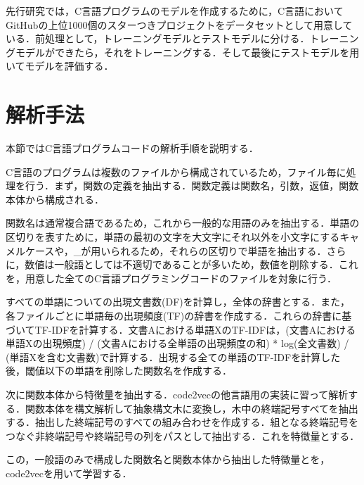 \documentclass[submit,techrep,noauthor]{ipsj}
\begin{document}
先行研究\cite{}では，C言語プログラムのモデルを作成するために，C言語においてGitHubの上位1000個のスターつきプロジェクトをデータセットとして用意している．前処理として，トレーニングモデルとテストモデルに分ける．トレーニングモデルができたら，それをトレーニングする．そして最後にテストモデルを用いてモデルを評価する．

\section{解析手法}

本節ではC言語プログラムコードの解析手順を説明する．

C言語のプログラムは複数のファイルから構成されているため，ファイル毎に処理を行う．まず，関数の定義を抽出する．関数定義は関数名，引数，返値，関数本体から構成される．

関数名は通常複合語であるため，これから一般的な用語のみを抽出する．単語の区切りを表すために，単語の最初の文字を大文字にそれ以外を小文字にするキャメルケースや，\_が用いられるため，それらの区切りで単語を抽出する．さらに，数値は一般語としては不適切であることが多いため，数値を削除する．これを，用意した全てのC言語プログラミングコードのファイルを対象に行う．

すべての単語についての出現文書数(DF)を計算し，全体の辞書とする．また，各ファイルごとに単語毎の出現頻度(TF)の辞書を作成する．これらの辞書に基づいてTF-IDFを計算する．文書Aにおける単語XのTF-IDFは，{(文書Aにおける単語Xの出現頻度) / (文書Aにおける全単語の出現頻度の和)} * log{(全文書数) / (単語Xを含む文書数)}で計算する．出現する全ての単語のTF-IDFを計算した後，閾値以下の単語を削除した関数名を作成する．

次に関数本体から特徴量を抽出する．code2vecの他言語用の実装に習って解析する．関数本体を構文解析して抽象構文木に変換し，木中の終端記号すべてを抽出する．抽出した終端記号のすべての組み合わせを作成する．組となる終端記号をつなぐ非終端記号や終端記号の列をパスとして抽出する．これを特徴量とする．

この，一般語のみで構成した関数名と関数本体から抽出した特徴量とを，code2vecを用いて学習する．


\end{document}
